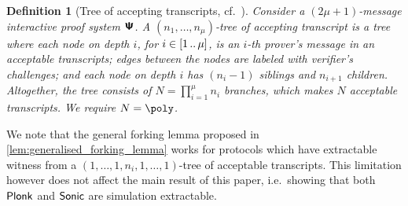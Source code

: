 \let\accentvec\vec \documentclass[runningheads]{llncs}
\newtheorem{definition}[theorem]{Definition}
\begin{document}
\begin{definition}[Tree of accepting transcripts, cf.~{\cite{EC:BCCGP16}}]
	\label{def:tree_of_accepting_transcripts}
	Consider a $(2\mu + 1)$-message interactive proof system $\bm{\mathsf{\Psi}}$. A $(n_1,
  \ldots, n_\mu)$-tree of accepting transcript is a tree where each node on
  depth $i$, for $i \in [1 \, .. \, \mu]$, is an $i$-th prover's message in an
  acceptable transcripts; edges between the nodes are labeled with verifier's
  challenges; and each node on depth $i$ has $(n_{i} - 1)$ siblings and $n_{i +
    1}$ children. Altogether, the tree consists of $N = \prod_{i = 1}^\mu n_i$
  branches, which makes $N$ acceptable transcripts. We require $N = \poly$.
\end{definition}

We note that the general forking lemma proposed in
\cref{lem:generalised_forking_lemma} works for protocols which have extractable
witness from a $(1, \ldots, 1, n_i, 1, \ldots, 1)$-tree of acceptable
transcripts. This limitation however does not affect the main result of this
paper, i.e.~showing that both $\textnormal{\textsf{Plonk}}$ and ${\textnormal{\textsf{Sonic}}}$ are simulation extractable.
\end{document}
